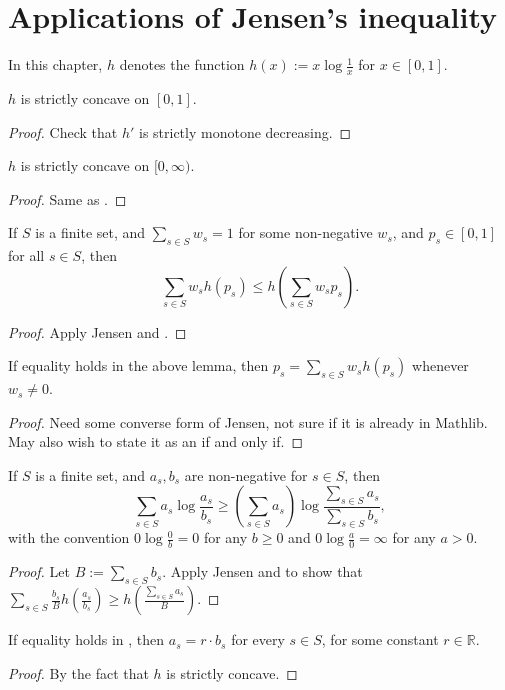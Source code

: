 \chapter{Applications of Jensen's inequality}

In this chapter, $h$ denotes the function $h(x) := x \log \frac{1}{x}$ for $x \in [0,1]$.

\begin{lemma}[Concavity]\label{concave}
  \leanok
  $h$ is strictly concave on $[0,1]$.
\end{lemma}

\begin{proof} \leanok Check that $h'$ is strictly monotone decreasing.
\end{proof}

\begin{lemma}[Concavity]\label{concave-general}
  $h$ is strictly concave on $[0,\infty)$.
\end{lemma}
\begin{proof}
Same as .
\end{proof}


\begin{lemma}[Jensen]\label{jensen}
   \leanok
  If $S$ is a finite set, and $\sum_{s \in S} w_s = 1$ for some non-negative $w_s$, and $p_s \in [0,1]$ for all $s \in S$, then
  $$ \sum_{s \in S} w_s h(p_s) \leq h(\sum_{s \in S} w_s p_s).$$
\end{lemma}

\begin{proof} \leanok Apply Jensen and .
\end{proof}

\begin{lemma}\label{converse-jensen}
  \leanok
If equality holds in the above lemma, then $p_s = \sum_{s \in S} w_s h(p_s)$ whenever $w_s \neq 0$.
\end{lemma}

\begin{proof} \leanok Need some converse form of Jensen, not sure if it is already in Mathlib.  May also wish to state it as an if and only if.
\end{proof}

\begin{lemma}
  \label{log-sum}
  If $S$ is a finite set, and $a_s,b_s$ are non-negative for $s\in S$, then 
  $$\sum_{s\in S} a_s \log\frac{a_s}{b_s}\ge \left(\sum_{s\in S}a_s\right)\log\frac{\sum_{s\in S} a_s}{\sum_{s\in S} b_s},$$
  with the convention $0\log\frac{0}{b}=0$ for any $b\ge 0$ and $0\log\frac{a}{0}=\infty$ for any $a>0$.
\end{lemma}
\begin{proof}
  Let $B:=\sum_{s\in S} b_s$. Apply Jensen and  to show that $\sum_{s\in S} \frac{b_s}{B} h(\frac{a_s}{b_s})\ge h(\frac{\sum_{s\in S} a_s}{B})$.
\end{proof}

\begin{lemma}
  \label{converse-log-sum}
If equality holds in , then $a_s=r\cdot b_s$ for every $s\in S$, for some constant $r\in \mathbb{R}$.
\end{lemma}

\begin{proof}
 By the fact that $h$ is strictly concave.
\end{proof}
